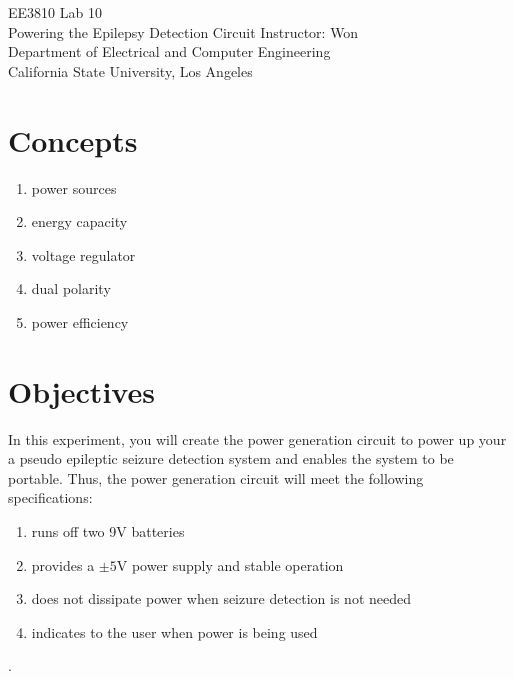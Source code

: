 \documentclass[12pt,oneside]{article}
\begin{document}
\begin{center}
\Large{EE3810 Lab 10 \\
Powering the Epilepsy Detection Circuit}
\large{Instructor: Won\\
Department of Electrical and Computer Engineering\\
California State University, Los Angeles}
\end{center}

\section{Concepts}
\begin{enumerate}
	\item power sources
	\item energy capacity
	\item voltage regulator
	\item dual polarity
	\item power efficiency
\end{enumerate}

%
%
%

\section{Objectives} 
In this experiment, you will create the power generation circuit to power up your a pseudo epileptic seizure detection system and enables the system to be portable.  Thus, the power generation circuit will meet the following specifications:
\begin{enumerate}
\item runs off two 9V batteries
\item provides a $\pm5$V power supply and stable operation
\item does not dissipate power when seizure detection is not needed
\item indicates to the user when power is being used
\end{enumerate}.
\end{document}
